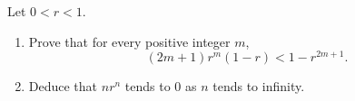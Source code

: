 Let $0<r<1$.
\begin{enumerate}
\item[(a)] Prove that for every positive integer $m$,
\[(2m+1)r^m(1-r)<1-r^{2m+1}.\]
\item[(b)] Deduce that $nr^n$ tends to $0$ as $n$ tends to infinity.
\end{enumerate}
